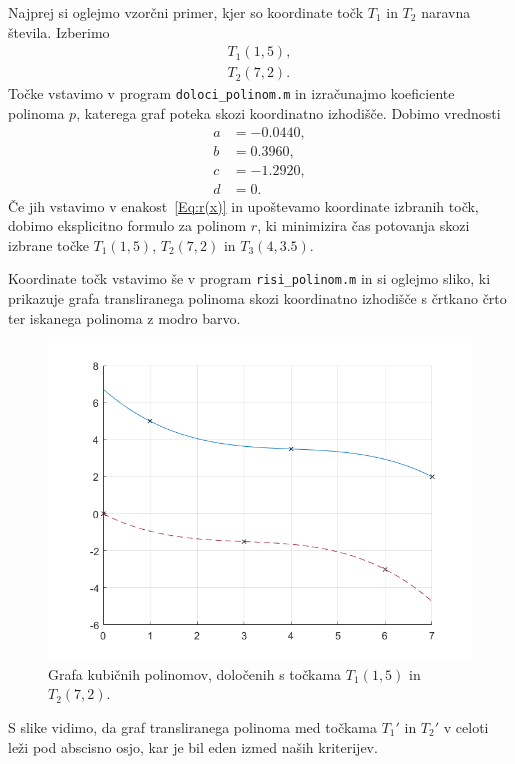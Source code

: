 \documentclass[a4paper]{article}
\begin{document}
Najprej si oglejmo vzorčni primer, kjer so koordinate točk $T_1$ in $T_2$ naravna števila. Izberimo
\begin{align*}
T_1(1,5), \\
T_2(7,2).
\end{align*}
%
Točke vstavimo v program \texttt{doloci\_polinom.m} in izračunajmo koeficiente polinoma $p$, katerega graf poteka skozi koordinatno izhodišče. Dobimo vrednosti
\begin{align*}
a &= -0.0440, \\
b &= 0.3960, \\
c &= -1.2920, \\
d &= 0.
\end{align*}
%
Če jih vstavimo v enakost~\eqref{Eq:r(x)} in upoštevamo koordinate izbranih točk, dobimo eksplicitno formulo za polinom $r$, ki minimizira čas potovanja skozi izbrane točke $T_1(1,5)$, $T_2(7,2)$ in $T_3(4,3.5)$.

Koordinate točk vstavimo še v program \texttt{risi\_polinom.m} in si oglejmo sliko, ki prikazuje grafa transliranega polinoma skozi koordinatno izhodišče s črtkano črto ter iskanega polinoma z modro barvo.
\begin{figure}[h!]
\begin{center}
\includegraphics[scale=0.52]{primer2-polinom.png}
\caption{Grafa kubičnih polinomov, določenih s točkama $T_1(1,5)$ in $T_2(7,2)$.}
\end{center}
\end{figure}
%
S slike vidimo, da graf transliranega polinoma med točkama $T_{1}'$ in $T_{2}'$ v celoti leži pod abscisno osjo, kar je bil eden izmed naših kriterijev.
\end{document}

